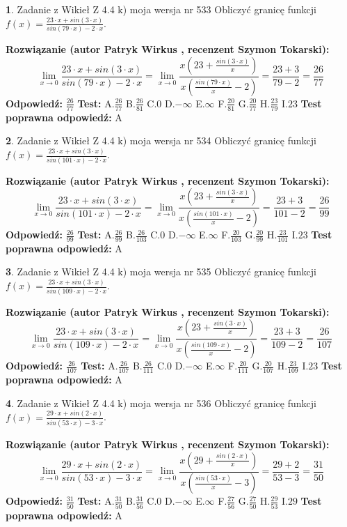\documentclass[12pt, a4paper]{article}
\theoremstyle{definition} %
\newtheorem{zad}{}
\newcommand{\zadStart}[1]{\begin{zad}#1\newline}
\newcommand{\zadStop}{\end{zad}}
\newcommand{\rozwStart}[2]{\noindent \textbf{Rozwiązanie (autor #1 , recenzent #2): }\newline}
\newcommand{\rozwStop}{\newline}
\newcommand{\odpStart}{\noindent \textbf{Odpowiedź:}\newline}
\newcommand{\odpStop}{\newline}
\newcommand{\testStart}{\noindent \textbf{Test:}\newline}
\newcommand{\testStop}{\newline}
\newcommand{\kluczStart}{\noindent \textbf{Test poprawna odpowiedź:}\newline}
\newcommand{\kluczStop}{\newline}
\begin{document}
\zadStart{Zadanie z Wikieł Z 4.4 k) moja wersja nr 533}
Obliczyć granicę funkcji $f(x)=\frac{23\cdot x +sin(3\cdot x)}{sin(79\cdot x) -2\cdot x}$.
\zadStop
\rozwStart{Patryk Wirkus}{Szymon Tokarski}
$$\lim\limits_{x\to 0}\frac{23\cdot x +sin(3\cdot x)}{sin(79\cdot x) -2\cdot x}
=\lim\limits_{x\to 0}\frac{x(23+\frac{sin(3\cdot x)}{x})}{x(\frac{sin(79\cdot x)}{x}-2)}
=\frac{23+3}{79-2} = \frac{26}{77}$$
\rozwStop
\odpStart
$\frac{26}{77}$
\odpStop
\testStart
A.$\frac{26}{77}$
B.$\frac{26}{81}$
C.$0$
D.$-\infty$
E.$\infty$
F.$\frac{20}{81}$
G.$\frac{20}{77}$
H.$\frac{23}{79}$
I.$23$
\testStop
\kluczStart
A
\kluczStop



\zadStart{Zadanie z Wikieł Z 4.4 k) moja wersja nr 534}
Obliczyć granicę funkcji $f(x)=\frac{23\cdot x +sin(3\cdot x)}{sin(101\cdot x) -2\cdot x}$.
\zadStop
\rozwStart{Patryk Wirkus}{Szymon Tokarski}
$$\lim\limits_{x\to 0}\frac{23\cdot x +sin(3\cdot x)}{sin(101\cdot x) -2\cdot x}
=\lim\limits_{x\to 0}\frac{x(23+\frac{sin(3\cdot x)}{x})}{x(\frac{sin(101\cdot x)}{x}-2)}
=\frac{23+3}{101-2} = \frac{26}{99}$$
\rozwStop
\odpStart
$\frac{26}{99}$
\odpStop
\testStart
A.$\frac{26}{99}$
B.$\frac{26}{103}$
C.$0$
D.$-\infty$
E.$\infty$
F.$\frac{20}{103}$
G.$\frac{20}{99}$
H.$\frac{23}{101}$
I.$23$
\testStop
\kluczStart
A
\kluczStop



\zadStart{Zadanie z Wikieł Z 4.4 k) moja wersja nr 535}
Obliczyć granicę funkcji $f(x)=\frac{23\cdot x +sin(3\cdot x)}{sin(109\cdot x) -2\cdot x}$.
\zadStop
\rozwStart{Patryk Wirkus}{Szymon Tokarski}
$$\lim\limits_{x\to 0}\frac{23\cdot x +sin(3\cdot x)}{sin(109\cdot x) -2\cdot x}
=\lim\limits_{x\to 0}\frac{x(23+\frac{sin(3\cdot x)}{x})}{x(\frac{sin(109\cdot x)}{x}-2)}
=\frac{23+3}{109-2} = \frac{26}{107}$$
\rozwStop
\odpStart
$\frac{26}{107}$
\odpStop
\testStart
A.$\frac{26}{107}$
B.$\frac{26}{111}$
C.$0$
D.$-\infty$
E.$\infty$
F.$\frac{20}{111}$
G.$\frac{20}{107}$
H.$\frac{23}{109}$
I.$23$
\testStop
\kluczStart
A
\kluczStop



\zadStart{Zadanie z Wikieł Z 4.4 k) moja wersja nr 536}
Obliczyć granicę funkcji $f(x)=\frac{29\cdot x +sin(2\cdot x)}{sin(53\cdot x) -3\cdot x}$.
\zadStop
\rozwStart{Patryk Wirkus}{Szymon Tokarski}
$$\lim\limits_{x\to 0}\frac{29\cdot x +sin(2\cdot x)}{sin(53\cdot x) -3\cdot x}
=\lim\limits_{x\to 0}\frac{x(29+\frac{sin(2\cdot x)}{x})}{x(\frac{sin(53\cdot x)}{x}-3)}
=\frac{29+2}{53-3} = \frac{31}{50}$$
\rozwStop
\odpStart
$\frac{31}{50}$
\odpStop
\testStart
A.$\frac{31}{50}$
B.$\frac{31}{56}$
C.$0$
D.$-\infty$
E.$\infty$
F.$\frac{27}{56}$
G.$\frac{27}{50}$
H.$\frac{29}{53}$
I.$29$
\testStop
\kluczStart
A
\kluczStop
\end{document}
